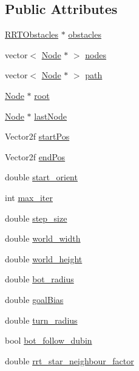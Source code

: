 \subsection*{Public Attributes}
\begin{DoxyCompactItemize}
\item 
\hyperlink{classRRTObstacles}{R\+R\+T\+Obstacles} $\ast$ \hyperlink{classRRTSTAR_a3d9f67d4f4efa9681148b683e7b2455c}{obstacles}
\item 
vector$<$ \hyperlink{structNode}{Node} $\ast$ $>$ \hyperlink{classRRTSTAR_aef5c314d28c8ec948f07efa5f4cabefe}{nodes}
\item 
vector$<$ \hyperlink{structNode}{Node} $\ast$ $>$ \hyperlink{classRRTSTAR_a3c4afcfe867e23c36e268aedd488e062}{path}
\item 
\hyperlink{structNode}{Node} $\ast$ \hyperlink{classRRTSTAR_a93a4dad750b6a408269ca45a4b618d4e}{root}
\item 
\hyperlink{structNode}{Node} $\ast$ \hyperlink{classRRTSTAR_a46e3d08a8bd512c4f5747cdfbea41228}{last\+Node}
\item 
Vector2f \hyperlink{classRRTSTAR_ab3a0269ff354a27408ae48011a0e29f8}{start\+Pos}
\item 
Vector2f \hyperlink{classRRTSTAR_a220f337b1e11e8308b1bb590e0ff926a}{end\+Pos}
\item 
double \hyperlink{classRRTSTAR_a571433cf52df263c3e866c317e0ac4e3}{start\+\_\+orient}
\item 
int \hyperlink{classRRTSTAR_a9831be75ba6cce1bddfba73c9639e8c4}{max\+\_\+iter}
\item 
double \hyperlink{classRRTSTAR_a6e49feee90b9dd0a780444ff07520512}{step\+\_\+size}
\item 
double \hyperlink{classRRTSTAR_adc9c88a24560ab3a537ea374672b0121}{world\+\_\+width}
\item 
double \hyperlink{classRRTSTAR_a03ea0b6f54575f892d24553db558ce11}{world\+\_\+height}
\item 
double \hyperlink{classRRTSTAR_ac630bd4c26bf038a9158f02e4af761b4}{bot\+\_\+radius}
\item 
double \hyperlink{classRRTSTAR_ab458943c70394087a8ddc5f8b2f0fc79}{goal\+Bias}
\item 
double \hyperlink{classRRTSTAR_a72f670ad016b3e6bbf4a429873362c11}{turn\+\_\+radius}
\item 
bool \hyperlink{classRRTSTAR_a7325b9cbe347fded3d2541e017207c9e}{bot\+\_\+follow\+\_\+dubin}
\item 
double \hyperlink{classRRTSTAR_acb06c8a7193ad7776cf155a10142c5c3}{rrt\+\_\+star\+\_\+neighbour\+\_\+factor}
\end{DoxyCompactItemize}


